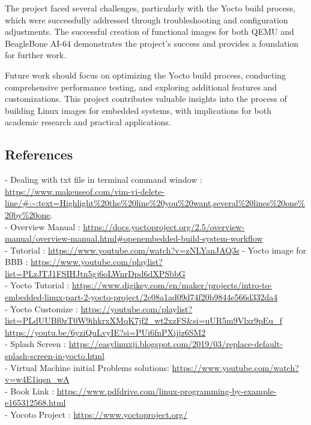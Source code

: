 The project faced several challenges, particularly with the Yocto build process, which were successfully addressed through troubleshooting and configuration adjustments. The successful creation of functional images for both QEMU and BeagleBone AI-64 demonstrates the project's success and provides a foundation for further work.

Future work should focus on optimizing the Yocto build process, conducting comprehensive performance testing, and exploring additional features and customizations. This project contributes valuable insights into the process of building Linux images for embedded systems, with implications for both academic research and practical applications. \\

\iffalse
\subsection{References}
- Dealing with txt file in terminal command window : \\ \url{https://www.makeuseof.com/vim-vi-delete-line/#:~:text=Highlight%20the%20line%20you%20want,several%20lines%20one%20by%20one}. \\
- Overview Manual : \url{https://docs.yoctoproject.org/2.5/overview-manual/overview-manual.html#openembedded-build-system-workflow }\\
- Tutorial : \url{https://www.youtube.com/watch?v=zNLYanJAQ3s} 
- Yocto image for BBB : \url{https://www.youtube.com/playlist?list=PLzJTJ1FSIHJtn5gj6oLWnrDpd6dXPSbbG }\\
- Yocto Tutorial : \url{https://www.digikey.com/en/maker/projects/intro-to-embedded-linux-part-2-yocto-project/2c08a1ad09d74f20b9844e566d332da4}\\
- Yocto Customize : \url{https://youtube.com/playlist?list=PLdUUBf0zT0W9ihkrxXMqK7jf2_wt2xzFS&si=uUR5m9Vlxr9pEu_f }\\
\url{https://youtu.be/6yziQuLvyIE?si=PUi6fnPXijjz6SM2 }\\
- Splash Screen : \url{https://easylinuxji.blogspot.com/2019/03/replace-default-splash-screen-in-yocto.html}\\
- Virtual Machine initial Problems solutions: \url{https://www.youtube.com/watch?v=w4E1iqsn_wA }\\
-  Book Link : \url{https://www.pdfdrive.com/linux-programming-by-example-e165312568.html} \\
- Yocoto Project :  \url{https://www.yoctoproject.org/}\\
